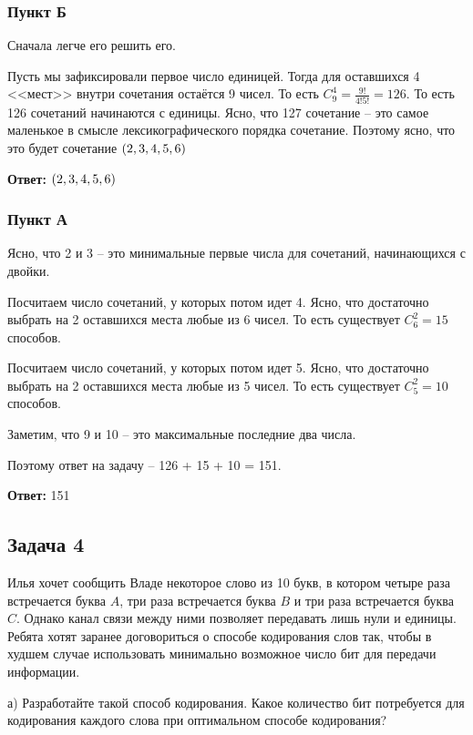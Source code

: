 \subsubsection{Пункт Б}

Сначала легче его решить его.

Пусть мы зафиксировали первое число единицей. Тогда для оставшихся 4 <<мест>> внутри сочетания остаётся 9 чисел. То есть $C^4_9 = \frac{9!}{4!5!} = 126$. То есть 126 сочетаний начинаются с единицы. Ясно, что 127 сочетание -- это самое маленькое в смысле лексикографического порядка сочетание. Поэтому ясно, что это будет сочетание $\left({2, 3, 4, 5, 6}\right)$

\textbf{Ответ:} $\left({2, 3, 4, 5, 6}\right)$ 

\subsubsection{Пункт А}

Ясно, что 2 и 3 -- это минимальные первые числа для сочетаний, начинающихся с двойки.

Посчитаем число сочетаний, у которых потом идет 4. Ясно, что достаточно выбрать на 2 оставшихся места любые из 6 чисел. То есть существует $C^2_6 = 15$ способов.

Посчитаем число сочетаний, у которых потом идет 5. Ясно, что достаточно выбрать на 2 оставшихся места любые из 5 чисел. То есть существует $C^2_5 = 10$ способов.

Заметим, что 9 и 10 -- это максимальные последние два числа. 

Поэтому ответ на задачу -- 126 + 15 + 10 = 151.

\textbf{Ответ:} 151 
 
\subsection{Задача 4}

Илья хочет сообщить Владе некоторое слово из 10 букв, в котором четыре раза встречается буква $A$, три раза встречается буква $B$ и три раза встречается буква $C$. Однако канал связи между ними позволяет передавать лишь нули и единицы. Ребята
хотят заранее договориться о способе кодирования слов так, чтобы в худшем случае
использовать минимально возможное число бит для передачи информации.

а) Разработайте такой способ кодирования. Какое количество бит потребуется для
кодирования каждого слова при оптимальном способе кодирования?

